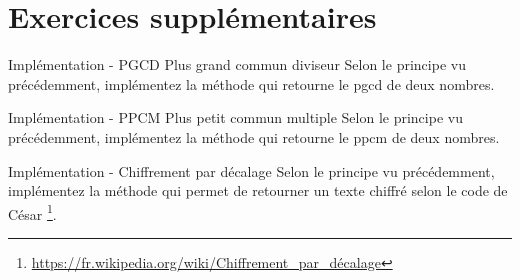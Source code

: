\documentclass[a4paper,11pt]{style-esi/td}
\begin{document}
\section{Exercices supplémentaires}

\begin{Exercice}{Implémentation - PGCD Plus grand commun diviseur}
	Selon le principe vu précédemment, 
	implémentez la méthode  
	qui retourne le pgcd de deux nombres.
\end{Exercice}

\begin{Exercice}{Implémentation - PPCM Plus petit commun multiple}
	Selon le principe vu précédemment, 
	implémentez la méthode  
	qui retourne le ppcm de deux nombres.
\end{Exercice}

\begin{Exercice}{Implémentation - Chiffrement par décalage}
	Selon le principe vu précédemment, 
	implémentez la méthode  
	qui permet de retourner un texte chiffré selon le code de César%
	\footnote{%
		\url{https://fr.wikipedia.org/wiki/Chiffrement_par_décalage}
	}.
\end{Exercice}
\end{document}

